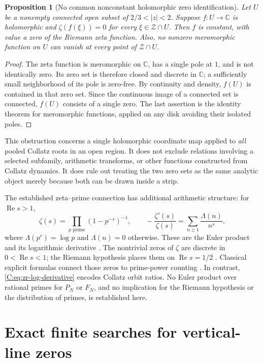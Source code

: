 \documentclass[11pt,a4paper]{article}
\newtheorem{proposition}[theorem]{Proposition}
\theoremstyle{definition}
\theoremstyle{remark}
\numberwithin{equation}{section}
\begin{document}
\begin{proposition}[No common nonconstant holomorphic zero identification]
\label{C:prop:zr-no-zeta-map}
Let $U$ be a nonempty
connected open subset of $2/3<|z|<2$. Suppose $f:U\to\mathbb C$ is
holomorphic and $\zeta(f(\xi))=0$ for every $\xi\in\mathcal Z\cap U$.
Then $f$ is constant, with value a zero of the Riemann zeta function.
Also, no nonzero meromorphic function on $U$ can vanish at every point of
$\mathcal Z\cap U$.
\end{proposition}
\begin{proof}
The zeta function is meromorphic on $\mathbb C$, has a single pole at $1$,
and is not identically zero. Its zero set is therefore closed and discrete
in $\mathbb C$; a sufficiently small neighborhood of its pole is zero-free.
By continuity and density, $f(U)$ is contained in that zero set. Since the
continuous image of a connected set is connected, $f(U)$ consists of a
single zero. The last assertion is the identity theorem for meromorphic
functions, applied on any disk avoiding their isolated poles.
\end{proof}

This obstruction concerns a single holomorphic coordinate map applied to
\emph{all} pooled Collatz roots in an open region. It does not exclude
relations involving a selected subfamily, arithmetic transforms, or other
functions constructed from Collatz dynamics. It does rule out treating the
two zero sets as the same analytic object merely because both can be drawn
inside a strip.

The established zeta--prime connection has additional arithmetic structure:
for $\operatorname{Re}s>1$,
\[
 \zeta(s)=\prod_{p\text{ prime}}(1-p^{-s})^{-1},
 \qquad
 -\frac{\zeta'(s)}{\zeta(s)}=
     \sum_{n\geq1}\frac{\Lambda(n)}{n^s},
\]
where $\Lambda(p^r)=\log p$ and $\Lambda(n)=0$ otherwise.
These are the Euler product and its logarithmic derivative
\cite{R071,R072}. The nontrivial zeros of
$\zeta$ are discrete in $0<\operatorname{Re}s<1$; the Riemann hypothesis
places them on $\operatorname{Re}s=1/2$ \cite{R073}. Classical
explicit formulas connect those zeros to prime-power counting
\cite{R074}. In contrast, \eqref{C:eq:zr-log-derivative}
encodes Collatz orbit ratios. No Euler product over rational primes for
$P_N$ or $F_N$, and no implication for the Riemann hypothesis or the
distribution of primes, is established here.


\section{Exact finite searches for vertical-line zeros}
\label{C:sec:finite-vertical-search}
\end{document}
